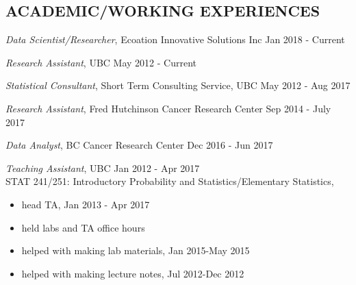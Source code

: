 \documentclass[margin]{res}
\begin{document}
\begin{resume}
 

 
\section{ACADEMIC/WORKING EXPERIENCES} 

\vspace{30pt}

{\sl Data Scientist/Researcher}, Ecoation Innovative Solutions Inc \hfill Jan 2018 - Current 

{\sl Research Assistant}, UBC \hfill May 2012 - Current 

{\sl Statistical Consultant}, Short Term Consulting Service, UBC
\hfill May 2012 - Aug 2017

{\sl Research Assistant}, Fred Hutchinson Cancer Research Center 
                 \hfill Sep 2014 - July 2017 


{\sl Data Analyst}, BC Cancer Research Center
                 \hfill Dec 2016 - Jun 2017 
                

{\sl Teaching Assistant}, UBC \hfill Jan 2012 - Apr 2017 \\
                STAT 241/251: Introductory Probability and Statistics/Elementary Statistics, \\
                 \begin{itemize}  \itemsep -2pt %
                 \item head TA, Jan 2013 - Apr 2017
                 \item held labs and TA office hours
                 \item helped with making lab materials, Jan 2015-May 2015
                 \item helped with making lecture notes, Jul 2012-Dec 2012                 
                \end{itemize}
 

\end{resume}
\end{document}
